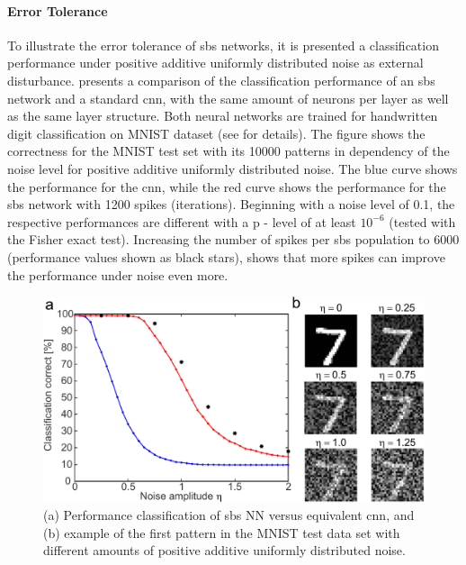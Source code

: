 \paragraph{Error Tolerance}

To illustrate the error tolerance of \gls{sbs} networks, it is presented a classification performance under positive additive uniformly distributed noise as external disturbance.  presents a comparison of the classification performance of an \gls{sbs} network and a standard \gls{cnn}, with the same amount of
neurons per layer as well as the same layer structure. Both neural networks are trained for handwritten digit classification on MNIST dataset \cite{lecun1998mnist} (see \cite{rotermund2019Backpropagation} for details). The figure shows the correctness for the MNIST test set with its \num[group-separator={,}]{10000} patterns in dependency of the noise level for positive additive
uniformly distributed noise. The blue curve shows the performance for
the \gls{cnn}, while the red curve shows the performance for
the \gls{sbs} network with \num[group-separator={,}]{1200} spikes (iterations). Beginning
with a noise level of 0.1, the respective performances are different
with a p - level of at least $10^{-6}$ (tested with the Fisher exact
test). Increasing the number of spikes per \gls{sbs} population to \num[group-separator={,}]{6000}
(performance values shown as black stars), shows that more spikes can
improve the performance under noise even more.

\begin{figure}
	\centering
	\includegraphics[width=0.5\columnwidth]{./chapters/sbs_accelerator/figures/sbs_robustnes.pdf}
	\caption{(a) Performance classification of \gls{sbs} NN versus equivalent \gls{cnn}, and (b) example of the first pattern in the MNIST test data set with different amounts of positive additive uniformly distributed noise.}
	\label{fig:robustnes_sbs}
\end{figure}

